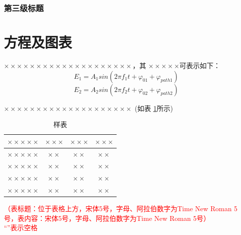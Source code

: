 \documentclass[11pt,a4paper]{article}
\theoremstyle{definition} \newtheorem{law}[thm]{Law}
\theoremstyle{plain} \newtheorem{jury}[thm]{Jury}
\theoremstyle{remark} \newtheorem*{marg}{Margaret}
\newcommand{\reftab}[1]{表 \ref{#1}}
\numberwithin{equation}{section}
\begin{document}
	\subsubsection{第三级标题}
	
	

	\section{方程及图表}
	 $ \times\times\times\times\times\times\times\times\times\times\times\times\times\times\times\times\times\times\times\times $，其 $ \times\times\times\times\times$可表示如下：
	\begin{equation}
		E_{1}=A_{1}sin\!\left(2\pi f_{1}t+\varphi_{01}+\varphi_{path1} \right)
	\end{equation}
	\begin{equation}
	E_{2}=A_{2}sin\!\left(2\pi f_{2}t+\varphi_{02}+\varphi_{path2} \right)
	\end{equation}
    
     $ \times\times\times\times\times\times\times\times\times\times\times\times\times\times\times\times\times\times\times\times $  (如\reftab{table1}所示)

     \begin{table}[htpb]
		\centering
		\caption{样表}
		\label{table1}
	    \begin{tabular}{cccc}
	    	\toprule
	    	$ \times\times\times\times\times $ & $ \times\times\times $ & $ \times\times\times $ & $ \times\times\times $ \\ 
	    	\hline
	 	    $ \times\times\times\times\times $ & $ \times\times $ & $ \times\times $ & $ \times\times $ \\ 
	    	$ \times\times\times\times\times $ & $ \times\times $ & $ \times\times $ & $ \times\times $ \\ 	
	    	$ \times\times\times\times\times $ & $ \times\times $ & $ \times\times $ & $ \times\times $ \\ 	    	\cline{2-4}
	    	$ \times\times\times\times\times $ & $ \times\times $ & $ \times\times $ & $ \times\times $ \\
	    	\bottomrule
	    \end{tabular}
	\end{table}
 \textcolor{red}{（表标题：位于表格上方，宋体5号，字母、阿拉伯数字为Time New Roman 5号，表内容：宋体5号，字母、阿拉伯数字为Time New Roman 5号）\\ ``\fbox{\phantom{a}}''表示空格}
\end{document}
